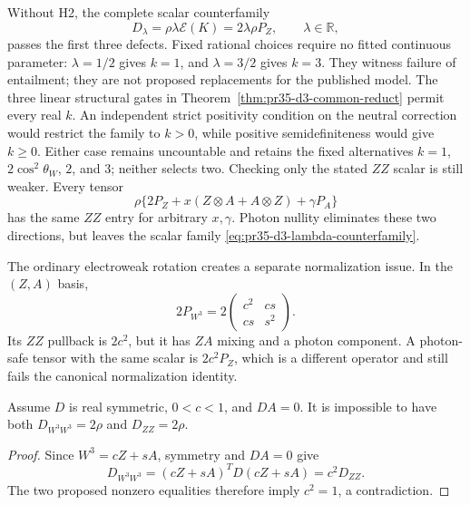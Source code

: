 Without H2, the complete scalar counterfamily
\begin{equation}
 D_\lambda=\rho\lambda\mathcal E(K)=2\lambda\rho P_Z,
 \qquad \lambda\in\mathbb R,
 \label{eq:pr35-d3-lambda-counterfamily}
\end{equation}
passes the first three defects.  Fixed rational choices require no fitted continuous parameter: $\lambda=1/2$ gives $k=1$, and $\lambda=3/2$ gives $k=3$.  They witness failure of entailment; they are not proposed replacements for the published model. The three linear structural gates in Theorem~\ref{thm:pr35-d3-common-reduct} permit every real $k$.  An independent strict positivity condition on the neutral correction would restrict the family to $k>0$, while positive semidefiniteness would give $k\geq0$.  Either case remains uncountable and retains the fixed alternatives $k=1$, $2\cos^2\theta_W$, $2$, and $3$; neither selects two. Checking only the stated $ZZ$ scalar is still weaker.  Every tensor
\begin{equation}
 \rho\{2P_Z+x(Z\otimes A+A\otimes Z)+\gamma P_A\}
\end{equation}
has the same $ZZ$ entry for arbitrary $x,\gamma$.  Photon nullity eliminates these two directions, but leaves the scalar family
\eqref{eq:pr35-d3-lambda-counterfamily}.

The ordinary electroweak rotation creates a separate normalization issue.  In
the $(Z,A)$ basis,
\begin{equation}
 2P_{W^3}=2\begin{pmatrix}c^2&cs\\cs&s^2\end{pmatrix}.
 \label{eq:pr35-d3-literal-w3-embedding}
\end{equation}
Its $ZZ$ pullback is $2c^2$, but it has $ZA$ mixing and a photon component.
A photon-safe tensor with the same scalar is $2c^2P_Z$, which is a different
operator and still fails the canonical normalization identity.

\begin{proposition}
\label{prop:pr35-d3-mixing-nogo}
Assume $D$ is real symmetric, $0<c<1$, and $DA=0$.  It is impossible to have
both $D_{W^3W^3}=2\rho$ and $D_{ZZ}=2\rho$.
\end{proposition}

\begin{proof}
Since $W^3=cZ+sA$, symmetry and $DA=0$ give
\begin{equation}
 D_{W^3W^3}=(cZ+sA)^TD(cZ+sA)=c^2D_{ZZ}.
\end{equation}
The two proposed nonzero equalities therefore imply $c^2=1$, a contradiction.
\end{proof}

